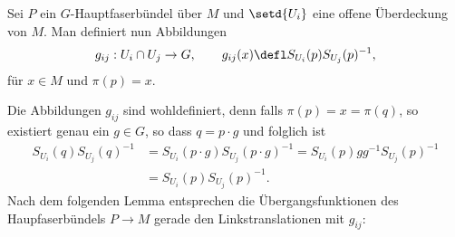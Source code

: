 \documentclass[%
	paper=a5,%
	fleqn,%
	DIV=18,%
	BCOR=0mm,
	fontsize=11pt,
	titlepage=false,%
	bibliography=totoc,
	DIV=18,%
	twoside=true,
	pdftitle=Riemannsche Geometrie,
	pdfauthor=Uwe Semmelmann,
	numbers=noendperiod]%
	{scrbook}
\begin{document}
\begin{defn}
Sei $P$ ein $G$-Hauptfaserbündel über $M$ und $\setd{U_i}$ eine offene
Überdeckung von $M$. Man definiert nun Abbildungen
\begin{align*}
g_{ij} : U_i\cap U_j\to G,\qquad g_{ij}(x)\defl S_{U_i}(p)S_{U_j}(p)^{-1},
\end{align*}
für $x\in M$ und $\pi(p)=x$.\fish
\end{defn}

Die Abbildungen $g_{ij}$ sind wohldefiniert, denn falls $\pi(p) = x = \pi(q)$,
so existiert genau ein $g\in G$, so dass $q = p\cdot g$ und folglich ist
\begin{align*}
S_{U_i}(q)S_{U_j}(q)^{-1}
&=
S_{U_i}(p\cdot g)S_{U_j}(p\cdot g)^{-1}
= S_{U_i}(p)gg^{-1}S_{U_j}(p)^{-1}\\
&= S_{U_i}(p)S_{U_j}(p)^{-1}.
\end{align*}
Nach dem folgenden Lemma entsprechen die Übergangsfunktionen des Haupfaserbündels $P \to M$ gerade den
Linkstranslationen mit $g_{ij}$:
\end{document}
